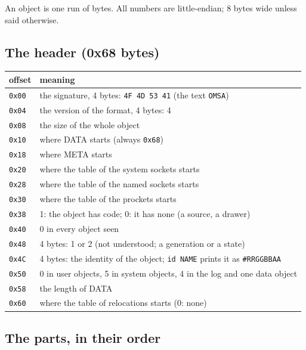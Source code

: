 \documentclass[11pt,a4paper]{article}
\newcommand{\cmd}[1]{\texttt{#1}}
\begin{document}
An object is one run of bytes. All numbers are little-endian; 8 bytes wide unless said otherwise.

\subsection{The header (0x68 bytes)}

\begin{longtable}{@{}l p{11.5cm}@{}}
\toprule
offset & meaning \\ \midrule
\texttt{0x00} & the signature, 4 bytes: \texttt{4F 4D 53 41} (the text \texttt{OMSA}) \\
\texttt{0x04} & the version of the format, 4 bytes: 4 \\
\texttt{0x08} & the size of the whole object \\
\texttt{0x10} & where DATA starts (always \texttt{0x68}) \\
\texttt{0x18} & where META starts \\
\texttt{0x20} & where the table of the system sockets starts \\
\texttt{0x28} & where the table of the named sockets starts \\
\texttt{0x30} & where the table of the prockets starts \\
\texttt{0x38} & 1: the object has code; 0: it has none (a source, a drawer) \\
\texttt{0x40} & 0 in every object seen \\
\texttt{0x48} & 4 bytes: 1 or 2 (not understood; a generation or a state) \\
\texttt{0x4C} & 4 bytes: the identity of the object; \cmd{id NAME} prints it as \texttt{\#RRGGBBAA} \\
\texttt{0x50} & 0 in user objects, 5 in system objects, 4 in the log and one data object \\
\texttt{0x58} & the length of DATA \\
\texttt{0x60} & where the table of relocations starts (0: none) \\
\bottomrule
\end{longtable}

\subsection{The parts, in their order}
\end{document}
